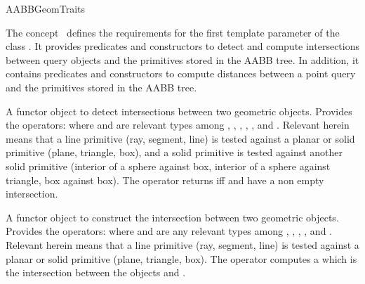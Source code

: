 \ccRefPageBegin


\begin{ccRefConcept}{AABBGeomTraits}


\ccDefinition
  
The concept \ccRefName\ defines the requirements for the first template parameter of the class . It provides predicates and constructors to detect and compute intersections between query objects and the primitives stored in the AABB tree. In addition, it contains  predicates and constructors to compute distances between a point query and the primitives stored in the AABB tree.

\ccTypes


{A functor object to detect intersections between two geometric objects.
Provides the operators:
where  and  are relevant types
among , , , , ,  and . Relevant herein means that a line primitive (ray, segment, line) is tested against a planar or solid primitive (plane, triangle, box), and a solid primitive is tested against another solid primitive (interior of a sphere against box, interior of a sphere against triangle, box against box). The operator returns  iff  and  have a non empty intersection.}

{A functor object to construct the intersection between two geometric objects.
Provides the operators:
 where  and  are any relevant types among , , ,  ,  and . Relevant herein means that a line primitive (ray, segment, line) is tested against a planar or solid primitive (plane, triangle, box). The operator computes a  which is the intersection between the objects  and .}


\end{ccRefConcept}
